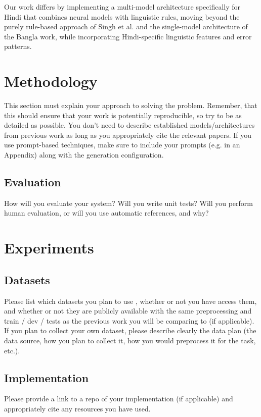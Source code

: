 \documentclass[11pt,a4paper]{article}
\begin{document}
Our work differs by implementing a multi-model architecture specifically for Hindi that combines neural models with linguistic rules, moving beyond the purely rule-based approach of Singh et al. and the single-model architecture of the Bangla work, while incorporating Hindi-specific linguistic features and error patterns.
\section{Methodology}

This section must explain your approach to solving the problem. Remember, that this should ensure that your work is potentially reproducible, so try to be as detailed as possible. You don't need to describe established models/architectures from previous work as long as you appropriately cite the relevant papers. If you use prompt-based techniques, make sure to include your prompts (e.g. in an Appendix) along with the generation configuration.

\subsection{Evaluation} 
How will you evaluate your system? Will you write unit tests? Will you perform human evaluation, or will you use automatic references, and why?

\section{Experiments}

\subsection{Datasets}
Please list which datasets you plan to use , whether or not you have access them, and whether or not they are publicly available with the same preprocessing and train / dev / tests as the previous work you will be comparing to (if applicable). If you plan to collect your own dataset, please describe clearly the data plan (the data source, how you plan to collect it, how you would preprocess it for the task, etc.).

\subsection{Implementation} 
Please provide a link to a repo of your implementation (if applicable) and appropriately cite any resources you have used.
\end{document}
